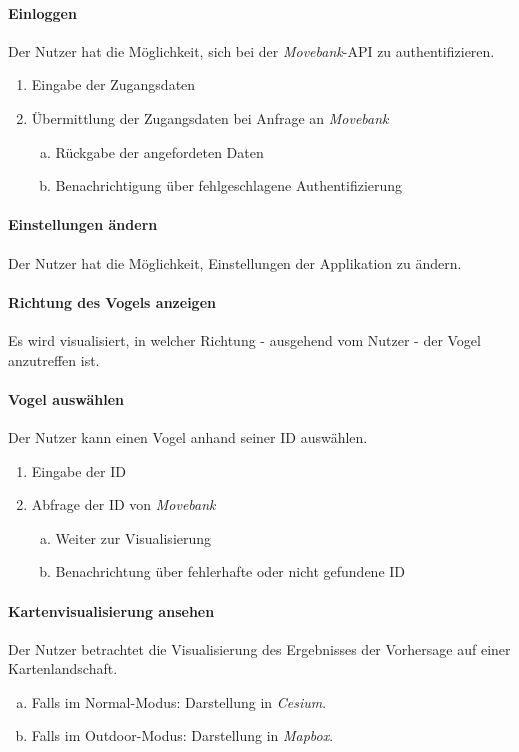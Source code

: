 \documentclass[12pt]{article} %
\newenvironment{cptenumerate}[1][label=\arabic*.]{\begin{enumerate}[#1] \setlength\itemsep{0em}}{\end{enumerate}}
\begin{document}
\paragraph{Einloggen} Der Nutzer hat die Möglichkeit, sich bei der \textit{Movebank}-API zu authentifizieren.
\begin{cptenumerate} 
  	 \item Eingabe der Zugangsdaten
  	 \item Übermittlung der Zugangsdaten bei Anfrage an \textit{Movebank}
  	 \begin{cptenumerate}[a.]
  	  	 \item Rückgabe der angefordeten Daten
  	  	 \item Benachrichtigung über fehlgeschlagene Authentifizierung
  	 \end{cptenumerate} 
 \end{cptenumerate}  

 \paragraph{Einstellungen ändern} Der Nutzer hat die Möglichkeit, Einstellungen der Applikation zu ändern.

 \paragraph{Richtung des Vogels anzeigen} Es wird visualisiert, in welcher Richtung - ausgehend vom Nutzer - der Vogel anzutreffen ist.

 \paragraph{Vogel auswählen} Der Nutzer kann einen Vogel anhand seiner ID auswählen.
 \begin{cptenumerate} 
     	 \item Eingabe der ID
     	 \item Abfrage der ID von \textit{Movebank}
     	 \begin{cptenumerate}[a.]
     	   	 \item Weiter zur Visualisierung
     	   	 \item Benachrichtung über fehlerhafte oder nicht gefundene ID
     	  \end{cptenumerate}  
    \end{cptenumerate}    

\paragraph{Kartenvisualisierung ansehen} Der Nutzer betrachtet die Visualisierung des Ergebnisses der Vorhersage auf einer Kartenlandschaft.
\begin{cptenumerate}[a.]
 	 \item Falls im Normal-Modus: Darstellung in \textit{Cesium}.
 	 \item Falls im Outdoor-Modus: Darstellung in \textit{Mapbox}. 
\end{cptenumerate}
\end{document}
